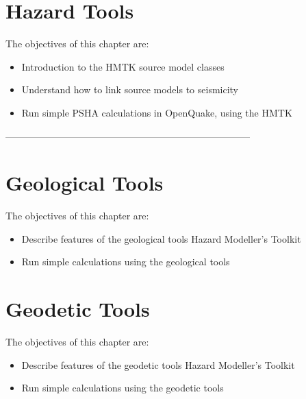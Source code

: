 \documentclass[11pt,a4paper,headings=small,dvips]{scrbook}
\newenvironment{myfancybox}{%
  \def\FrameCommand{\fboxsep=\FrameSep \fcolorbox{blue01}{honeydew}}%
  \color{black}\MakeFramed {\FrameRestore}}%
 {\endMakeFramed}
\begin{document}
\chapter{Hazard Tools}
\begin{myfancybox}
The objectives of this chapter are:
\begin{itemize}
    \item Introduction to the HMTK source model classes
    \item Understand how to link source models to seismicity
    \item Run simple PSHA calculations in OpenQuake, using the HMTK
\end{itemize}
\end{myfancybox}
  
\cleardoublepage
 

-----------------------------------------------------------------------------
\chapter{Geological Tools}
\begin{myfancybox}
The objectives of this chapter are:
\begin{itemize}
    \item Describe features of the geological tools Hazard Modeller's Toolkit 
    \item Run simple calculations using the geological tools 
\end{itemize}
\end{myfancybox}
  
\cleardoublepage


\chapter{Geodetic Tools}
\begin{myfancybox}
The objectives of this chapter are:
\begin{itemize}
    \item Describe features of the geodetic tools Hazard Modeller's Toolkit 
    \item Run simple calculations using the geodetic tools 
\end{itemize}
\end{myfancybox}
  
\cleardoublepage


\end{document}
